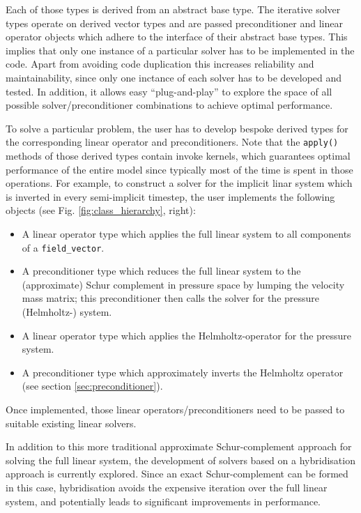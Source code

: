 \documentclass[times]{elsarticle}
\begin{document}
Each of those types is derived from an abstract base type. The iterative solver types operate on derived vector types and are passed preconditioner and linear operator objects which adhere to the interface of their abstract base types.  This implies that only one instance of a particular solver has to be implemented in the code. Apart from avoiding code duplication this increases reliability and maintainability, since only one inctance of each solver has to be developed and tested. In addition, it allows easy ``plug-and-play'' to explore the space of all possible solver/preconditioner combinations to achieve optimal performance.

To solve a particular problem, the user has to develop bespoke derived types for the corresponding linear operator and preconditioners. Note that the \texttt{apply()} methods of those derived types contain invoke kernels, which guarantees optimal performance of the entire model since typically most of the time is spent in those operations. For example, to construct a solver for the implicit linar system which is inverted in every semi-implicit timestep, the user implements the following objects (see Fig. \ref{fig:class_hierarchy}, right):
\begin{itemize}
\item A linear operator type which applies the full linear system to all components of a \texttt{field\_vector}.
\item A preconditioner type which reduces the full linear system to the (approximate) Schur complement in pressure space by lumping the velocity mass matrix; this preconditioner then calls the solver for the pressure (Helmholtz-) system.
\item A linear operator type which applies the Helmholtz-operator for the pressure system.
\item A preconditioner type which approximately inverts the Helmholtz operator (see section \ref{sec:preconditioner}).
\end{itemize}
Once implemented, those linear operators/preconditioners need to be passed to suitable existing linear solvers.

In addition to this more traditional approximate Schur-complement approach for solving the full linear system, the development of solvers based on a hybridisation approach is currently explored. Since an exact Schur-complement can be formed in this case, hybridisation avoids the expensive iteration over the full linear system, and potentially leads to significant improvements in performance.
\end{document}
